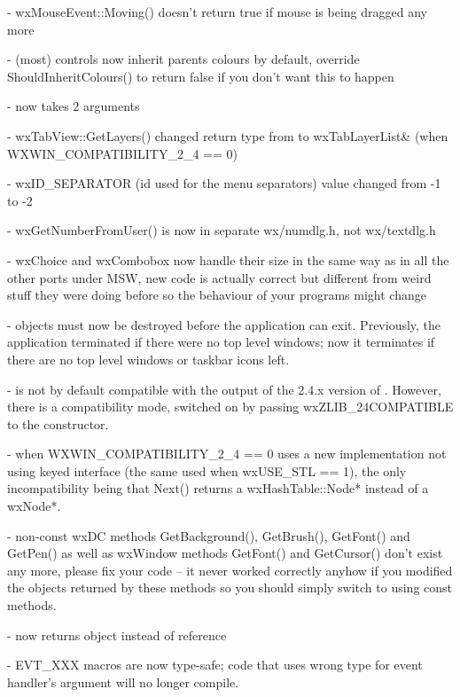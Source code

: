 - wxMouseEvent::Moving() doesn't return true if mouse is being dragged any more

- (most) controls now inherit parents colours by default, override
  ShouldInheritColours() to return false if you don't want this to happen

-  now takes 2 arguments

- wxTabView::GetLayers() changed return type from  to wxTabLayerList&
  (when WXWIN\_COMPATIBILITY\_2\_4 == 0)

- wxID\_SEPARATOR (id used for the menu separators) value changed from -1 to -2

- wxGetNumberFromUser() is now in separate wx/numdlg.h, not wx/textdlg.h

- wxChoice and wxCombobox now handle their size in the same way as in all the
  other ports under MSW, new code is actually correct but different from weird
  stuff they were doing before so the behaviour of your programs might change

-  objects must now be destroyed before the application can exit.
  Previously, the application terminated if there were no top level windows;
  now it terminates if there are no top level windows or taskbar icons left.

-  is not by default compatible with the output of the
  2.4.x version of . However, there is a compatibility mode,
  switched on by passing wxZLIB\_24COMPATIBLE to the constructor.

- when WXWIN\_COMPATIBILITY\_2\_4 == 0  uses a new implementation
  not using  keyed interface (the same used when wxUSE\_STL == 1),
  the only incompatibility being that Next() returns a wxHashTable::Node*
  instead of a wxNode*.

- non-const wxDC methods GetBackground(), GetBrush(), GetFont() and GetPen()
  as well as wxWindow methods GetFont() and GetCursor() don't exist any more,
  please fix your code -- it never worked correctly anyhow if you modified the
  objects returned by these methods so you should simply switch to using const
  methods.

-  now returns  object instead of reference

- EVT\_XXX macros are now type-safe; code that uses wrong type for event
  handler's argument will no longer compile.

